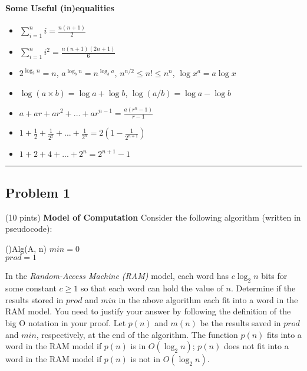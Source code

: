\documentclass[12pt]{article}
\begin{document}
\paragraph{Some Useful (in)equalities}
\begin{itemize}
    \item $\sum_{i=1}^n i= \frac{n(n+1)}{2}$
    \item $\sum_{i=1}^ni^2 = \frac{n(n+1)(2n+1)}{6}$
    \item $2^{\log_2n}=n$, $a^{\log_bn}=n^{\log_ba}$, $n^{n/2}\leq n! \leq n^n$, $\log x^a = a\log x$
    \item $\log (a\times b) = \log a + \log b$, $\log(a/b) = \log a - \log b$
    \item $a + ar + ar^2 + ... + ar^{n-1} = \frac{a(r^n-1)}{r-1}$
    \item $1 + \frac{1}{2} + \frac{1}{2^2} + ... + \frac{1}{2^n} = 2(1-\frac{1}{2^{n+1}})$
    \item $1 + 2 + 4 + ... + 2^n = 2^{n+1}-1$
\end{itemize}

\hrule

\subsection*{Problem 1} (10 pints) {\bf Model of Computation} 
Consider the following algorithm (written in pseudocode):
\smallskip

\begin{algorithm}[H]
\Fn(){Alg(A, n)}{
\SetAlgoLined
\SetNoFillComment
\DontPrintSemicolon
$min = 0$ \\
$prod = 1$ \\
}
\end{algorithm}



\smallskip
In the {\em Random-Access Machine (RAM)} model, each word has $c \log_2 n$ bits for some constant $c \geq 1$ so that each word can hold the value of $n$. Determine if the results stored in $prod$ and $min$ in the above algorithm each fit into a word in the RAM model. You need to justify your answer by following the definition of the big O notation in your proof. Let $p(n)$ and $m(n)$ be the results saved in $prod$ and $min$, respectively, at the end of the algorithm. The function $p(n)$ fits into a word in the RAM model if $p(n)$ is in $O(\log_2 n)$; $p(n)$ does not fit into a word in the RAM model if $p(n)$ is not in $O(\log_2 n)$.
\end{document}
